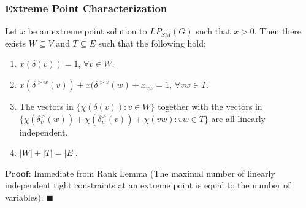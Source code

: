 \documentclass{beamer}
\begin{document}
\begin{frame}
\frametitle{Extreme Point Characterization}
Let $x$ be an extreme point solution to $LP_{SM}(G)$ such that $x>0$. Then there exists $W \subseteq V$ and $T \subseteq E$ such that the following hold:
\begin{enumerate}
\item $x(\delta(v)) = 1$, $\forall v \in W$.
\item $x(\delta^{>w}(v))+ x(\delta^{>v}(w) + x_{vw} = 1$, $\forall vw \in T$.
\item The vectors in $\{\chi(\delta(v)) : v \in W\}$ together with the vectors in $\{\chi(\delta_v^>(w)) + \chi(\delta_w^>(v)) + \chi(vw) : vw \in T\}$ are all linearly independent.
\item $|W| + |T| = |E|$.
\end{enumerate}
$\textbf{Proof:}$ Immediate from Rank Lemma (The maximal number of linearly independent tight constraints at an extreme point is equal to the number of variables). $\blacksquare$
\end{frame}
\end{document}
